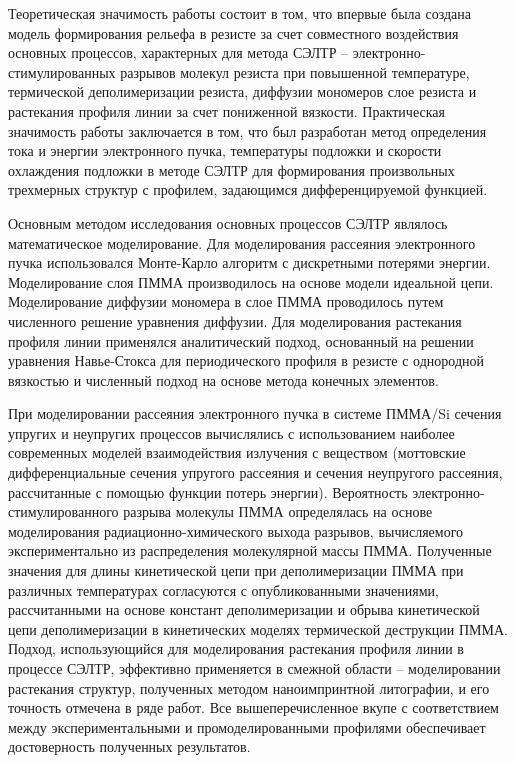 \influence

Теоретическая значимость работы состоит в том, что впервые была создана модель формирования рельефа в резисте за счет совместного воздействия основных процессов, характерных для метода СЭЛТР -- электронно-стимулированных разрывов молекул резиста при повышенной температуре, термической деполимеризации резиста, диффузии мономеров слое резиста и растекания профиля линии за счет пониженной вязкости.
Практическая значимость работы заключается в том, что был разработан метод определения тока и энергии электронного пучка, температуры подложки и скорости охлаждения подложки в методе СЭЛТР для формирования произвольных трехмерных структур с профилем, задающимся дифференцируемой функцией.


\methods

Основным методом исследования основных процессов СЭЛТР являлось математическое моделирование. Для моделирования рассеяния электронного пучка использовался Монте-Карло алгоритм с дискретными потерями энергии. Моделирование слоя ПММА производилось на основе модели идеальной цепи. Моделирование диффузии мономера в слое ПММА проводилось путем численного решение уравнения диффузии. Для моделирования растекания профиля линии применялся аналитический подход, основанный на решении уравнения Навье-Стокса для периодического профиля в резисте с однородной вязкостью и численный подход на основе метода конечных элементов.


\probation

При моделировании рассеяния электронного пучка в системе ПММА/Si сечения упругих и неупругих процессов вычислялись с использованием наиболее современных моделей взаимодействия излучения с веществом (моттовские дифференциальные сечения упругого рассеяния и сечения неупругого рассеяния, рассчитанные с помощью функции потерь энергии). Вероятность электронно-стимулированного разрыва молекулы ПММА определялась на основе моделирования радиационно-химического выхода разрывов, вычисляемого экспериментально из распределения молекулярной массы ПММА. Полученные значения для длины кинетической цепи при деполимеризации ПММА при различных температурах согласуются с опубликованными значениями, рассчитанными на основе констант деполимеризации и обрыва кинетической цепи деполимеризации в кинетических моделях термической деструкции ПММА. Подход, использующийся для моделирования растекания профиля линии в процессе СЭЛТР, эффективно применяется в смежной области -- моделировании растекания структур, полученных методом наноимпринтной литографии, и его точность отмечена в ряде работ. Все вышеперечисленное вкупе с соответствием между экспериментальными и промоделированными профилями обеспечивает достоверность полученных результатов.

